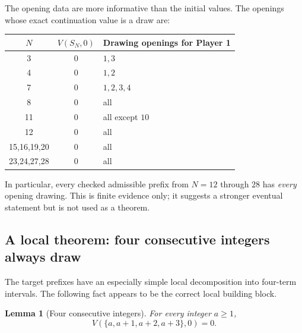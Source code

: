 \documentclass[11pt]{article}
\newtheorem{lemma}[theorem]{Lemma}
\theoremstyle{remark}
\begin{document}
The opening data are more informative than the initial values.  The openings
whose exact continuation value is a draw are:
\begin{center}
\begin{tabular}{ccl}
\toprule
$N$ & $V(S_N,0)$ & Drawing openings for Player 1 \\
\midrule
3 & $0$ & $1,3$\\
4 & $0$ & $1,2$\\
7 & $0$ & $1,2,3,4$\\
8 & $0$ & all\\
11 & $0$ & all except $10$\\
12 & $0$ & all\\
15,16,19,20 & $0$ & all\\
23,24,27,28 & $0$ & all\\
\bottomrule
\end{tabular}
\end{center}
In particular, every checked admissible prefix from $N=12$ through $28$ has
\emph{every} opening drawing.  This is finite evidence only; it suggests a
stronger eventual statement but is not used as a theorem.

\subsection{A local theorem: four consecutive integers always draw}
The target prefixes have an especially simple local decomposition into
four-term intervals.  The following fact appears to be the correct local
building block.

\begin{lemma}[Four consecutive integers]\label{lem:four-consecutive}
For every integer $a\ge1$,
\[
V(\{a,a+1,a+2,a+3\},0)=0.
\]
\end{lemma}
\end{document}
